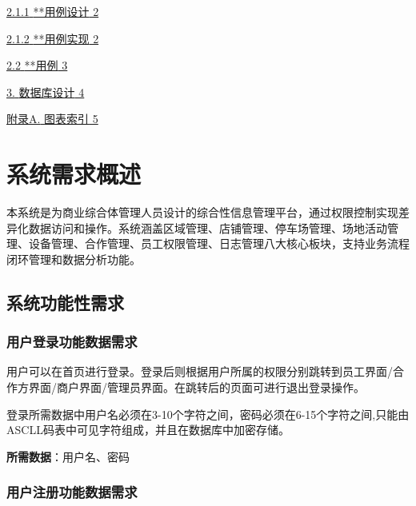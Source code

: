 \documentclass[]{article}
\begin{document}
\protect\hyperlink{ux7528ux6237ux7528ux4f8bux8bbeux8ba1}{{2.1.1}
    {**用例设计} 2}

\protect\hyperlink{ux7528ux6237ux7528ux4f8bux5b9eux73b0}{{2.1.2}
    {**用例实现} 2}

\protect\hyperlink{ux7528ux4f8b}{{2.2} {**用例} 3}

\protect\hyperlink{ux6570ux636eux5e93ux8bbeux8ba1}{{3.} {数据库设计} 4}

\protect\hyperlink{_Toc77076522}{{附录A.} {图表索引} 5}

\hypertarget{ux7cfbux7edfux9700ux6c42ux6982ux8ff0}{%
  \section{系统需求概述}\label{ux7cfbux7edfux9700ux6c42ux6982ux8ff0}}

本系统是为商业综合体管理人员设计的综合性信息管理平台，通过权限控制实现差异化数据访问和操作。系统涵盖区域管理、店铺管理、停车场管理、场地活动管理、设备管理、合作管理、员工权限管理、日志管理八大核心板块，支持业务流程闭环管理和数据分析功能。

\hypertarget{ux7cfbux7edfux529fux80fdux6027ux9700ux6c42}{%
  \subsection{系统功能性需求}\label{ux7cfbux7edfux529fux80fdux6027ux9700ux6c42}}

\hypertarget{ux7528ux6237ux767bux5f55ux529fux80fdux6570ux636eux9700ux6c42}{%
  \subsubsection{用户登录功能数据需求}\label{ux7528ux6237ux767bux5f55ux529fux80fdux6570ux636eux9700ux6c42}}

用户可以在首页进行登录。登录后则根据用户所属的权限分别跳转到员工界面/合作方界面/商户界面/管理员界面。在跳转后的页面可进行退出登录操作。

登录所需数据中用户名必须在3-10个字符之间，密码必须在6-15个字符之间,只能由ASCLL码表中可见字符组成，并且在数据库中加密存储。

\textbf{所需数据}：用户名、密码

\hypertarget{ux7528ux6237ux6ce8ux518cux529fux80fdux6570ux636eux9700ux6c42}{%
  \subsubsection{用户注册功能数据需求}\label{ux7528ux6237ux6ce8ux518cux529fux80fdux6570ux636eux9700ux6c42}}
\end{document}
